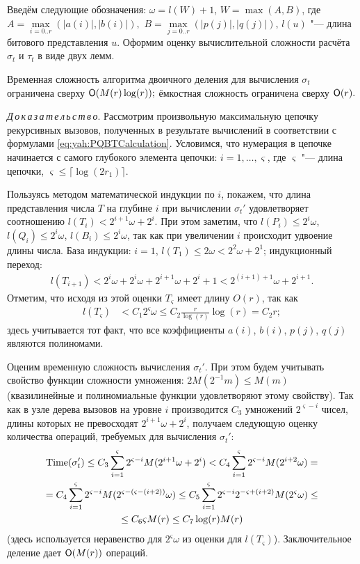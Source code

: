 Введём следующие обозначения:
$\omega=l(W)+1$, $W=\max(A,B)$,
где
$A=\max\limits_{i=0..r}(|a(i)|,|b(i)|),$
$B=\max\limits_{j=0..r}(|p(j)|,|q(j)|)$,
$l(u)$ "--- длина битового представления $u$.
Оформим оценку вычислительной сложности расчёта $\sigma_t$ и $\tau_t$
в виде двух лемм.

\smallskip

\begin{lemma}[1]Временная сложность алгоритма двоичного деления для вычисления
$\sigma_t$ ограничена сверху ${\sf O}(M(r)\log(r));$ ёмкостная сложность
ограничена сверху ${\sf O}(r).$
\end{lemma}

\textit {Д\,о\,к\,а\,з\,а\,т\,е\,л\,ь\,с\,т\,в\,о}.
Рассмотрим произвольную максимальную цепочку рекурсивных вызовов,
полученных в результате вычислений в соответствии с формулами
\eqref{eq:yah:PQBTCalculation}. Условимся, что  нумерация в цепочке
начинается с самого глубокого элемента цепочки: $i=1,\ldots,\varsigma$,
где $\varsigma$ "--- длина цепочки, $\varsigma\le\lceil\log(2r_1)\rceil$.

Пользуясь методом математической индукции по $i$, покажем, что длина
представления числа $T$ на глубине $i$ при вычислении
$\sigma_t'$ удовлетворяет соотношению $l(T_i)<2^{i+1}\omega+2^{i}$.
При этом заметим, что $l(P_i)\le 2^{i}\omega$, $l(Q_i)\le 2^{i}\omega$,
$l(B_i)\le 2^{i}\omega$, так как при увеличении $i$ происходит удвоение
длины числа. База индукции: $i=1$, $l(T_1)\le 2\omega<2^{2}\omega+2^{1}$;
индукционный переход:
%
\begin{align*}
l(T_{i+1})
<2^{i}\omega+2^{i}\omega+2^{i+1}\omega+2^{i}+1
<2^{(i+1)+1}\omega+2^{i+1}.
\end{align*}
%
Отметим, что исходя из этой оценки $T_{\varsigma}$ имеет длину
$O(r)$, так как
%
\begin{align*}
l(T_\varsigma)
&<C_1 2^{\varsigma}\omega\le C_2\frac{r}{\log(r)}\log(r)=C_2 r;
\end{align*}
%
здесь учитывается тот факт, что все коэффициенты $a(i)$, $b(i)$,
$p(j)$, $q(j)$ являются полиномами.

Оценим временную сложность вычисления $\sigma_t'$.
При этом будем учитывать свойство функции сложности умножения:
$2M(2^{-1}m)\le M(m)$ (квазилинейные и полиномиальные функции
удовлетворяют этому свойству). Так как в узле дерева вызовов
на уровне $i$ производится $C_3$ умножений $2^{\varsigma-i}$
чисел, длины которых не превосходят $2^{i+1}\omega+2^{i}$,
 получаем следующую оценку количества операций, требуемых
для вычисления $\sigma_t'$:
\begin{multline*}
{\rm Time}(\sigma_t')
\le C_3\sum_{i=1}^{\varsigma}{2^{\varsigma-i}M(2^{i+1}\omega+2^{i})}
< C_4\sum_{i=1}^{\varsigma}{2^{\varsigma-i}M(2^{i+2}\omega)}=\\
= C_4\sum_{i=1}^{\varsigma}{2^{\varsigma-i}M(2^{\varsigma-(\varsigma-(i+2))}\omega)}
\le C_5\sum_{i=1}^{\varsigma}{2^{\varsigma-i}2^{-\varsigma+(i+2)}M(2^{\varsigma}\omega)}\le \\
\le C_6 \varsigma M(r)\le C_7\log(r)M(r)
\end{multline*}
%
(здесь используется неравенство для $2^{\varsigma}\omega$ из оценки для $l(T_\varsigma)$).
Заключительное деление дает ${\sf O}(M(r))$ операций.

